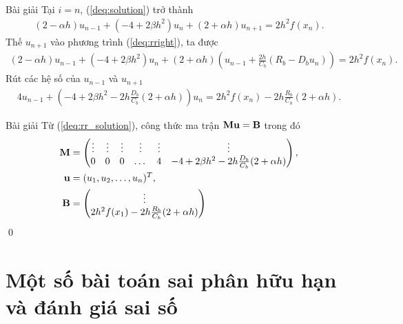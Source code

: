 \documentclass[9pt]{beamer}
\numberwithin{equation}{section}
\begin{document}
\begin{frame}
\begin{exampleblock}{Bài giải}
    Tại $i = n$, (\ref{deq:solution}) trở thành
    \begin{align}
        (2 - \alpha h) u_{n-1} + (-4 + 2 \beta h^2) u_n + (2 + \alpha h) u_{n+1} = 2h^2 f(x_n). \label{deq:rright}
    \end{align}
    Thế $u_{n+1}$ vào phương trình (\ref{deq:rright}), ta được
    \begin{align*}
        (2 - \alpha h) u_{n-1} + (-4 + 2 \beta h^2) u_n + (2 + \alpha h) \left(u_{n-1} + \frac{2h}{C_b}(R_b - D_b u_n)\right) = 2h^2 f(x_n).
    \end{align*}
    Rút các hệ số của $u_{n-1}$ và $u_{n+1}$
    \begin{align}
        4 u_{n-1} + \left(-4 + 2\beta h^2 -2h \frac{D_b}{C_b}  (2 + \alpha h)\right) u_n = 2h^2 f(x_n) - 2h \frac{R_b}{C_b}(2 + \alpha h). \label{deq:rr_solution}
    \end{align}
\end{exampleblock}
\end{frame}

\begin{frame}
\begin{exampleblock}{Bài giải}
    Từ (\ref{deq:rr_solution}), công thức ma trận ${\bf M} {\bf u} = {\bf B}$ trong đó
    \begin{align*}
        {\bf M} &= \begin{pmatrix}
            \vdots & \vdots & \vdots & \vdots & \vdots & \vdots \\
            0 & 0 & 0 & \dots & 4 & - 4 + 2\beta h^2 - 2h \frac{D_b}{C_b}(2 + \alpha h)
        \end{pmatrix}, \\
        {\bf u} &= (u_1, u_2, \ldots, u_n)^T, \\
        {\bf B} &= \begin{pmatrix}
            \vdots \\
            2h^2 f(x_1) - 2h \frac{R_b}{C_b}(2 + \alpha h)
        \end{pmatrix}
    \end{align*} \hfill \qed
\end{exampleblock}
\end{frame}

\section{Một số bài toán sai phân hữu hạn và đánh giá sai số}
\end{document}
